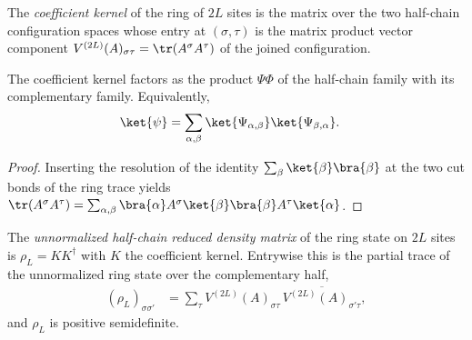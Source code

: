 \begin{definition}%
    \label{def:half_chain_kernel}
    \leanok
    The \emph{coefficient kernel} of the ring of $2L$ sites is the matrix over
    the two half-chain configuration spaces whose entry at $(\sigma,\tau)$ is
    the matrix product vector component
    $V^{(2L)}(A)_{\sigma\tau}=\tr(A^{\sigma}A^{\tau})$ of the joined
    configuration.
\end{definition}

\begin{lemma}%
    \label{lem:half_chain_kernel_split}
    \leanok
    The coefficient kernel factors as the product $\Psi\Phi$ of the
    half-chain family with its complementary family. Equivalently,
    \begin{align}
        \ket{\psi}
         & =\sum_{\alpha,\beta}
        \ket{\Psi_{\alpha,\beta}}\ket{\Psi_{\beta,\alpha}}.
        \label{eq:half_chain_resolution}
    \end{align}
\end{lemma}

\begin{proof}
    \leanok
    Inserting the resolution of the identity
    $\sum_{\beta}\ket{\beta}\bra{\beta}$ at the two cut bonds of the ring
    trace yields $\tr(A^{\sigma}A^{\tau})
        =\sum_{\alpha,\beta}\bra{\alpha}A^{\sigma}\ket{\beta}
        \bra{\beta}A^{\tau}\ket{\alpha}$.
\end{proof}

\begin{definition}%
    \label{def:half_chain_reduced}
    \leanok
    The \emph{unnormalized half-chain reduced density matrix} of the ring
    state on $2L$ sites is $\rho_L=KK^{\dagger}$ with $K$ the coefficient
    kernel. Entrywise this is the partial trace of the unnormalized ring state
    over the complementary half,
    \begin{align}
        (\rho_L)_{\sigma\sigma'}
         & =\sum_{\tau}
        V^{(2L)}(A)_{\sigma\tau}\,
        \overline{V^{(2L)}(A)_{\sigma'\tau}},
        \label{eq:half_chain_reduced_entry}
    \end{align}
    and $\rho_L$ is positive semidefinite.
\end{definition}

